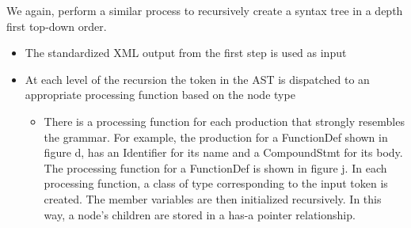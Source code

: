 \documentclass[thesis]{hmcposter}
\begin{document}
\begin{poster}
We again, perform a similar process to recursively create a syntax tree in a depth first top-down order.
\begin{itemize}
\item The standardized XML output from the first step is used as input
\item At each level of the recursion the token in the AST is dispatched to an appropriate processing function based on the node type
	\begin{itemize}
	\item There is a processing function for each production that strongly resembles the grammar. For example, the production for a FunctionDef shown in figure d, has an Identifier for its name and a CompoundStmt for its body. The processing function for a FunctionDef is shown in figure j. In each processing function, a class of type corresponding to the input token is created. The member variables are then initialized recursively. In this way, a node's children are stored in a has-a pointer relationship. 
	\end{itemize}
\end{itemize}


\vspace{0.5in}

\begin{figure}
\begin{center}
\end{center}
\end{figure}




\end{poster}
\end{document}
